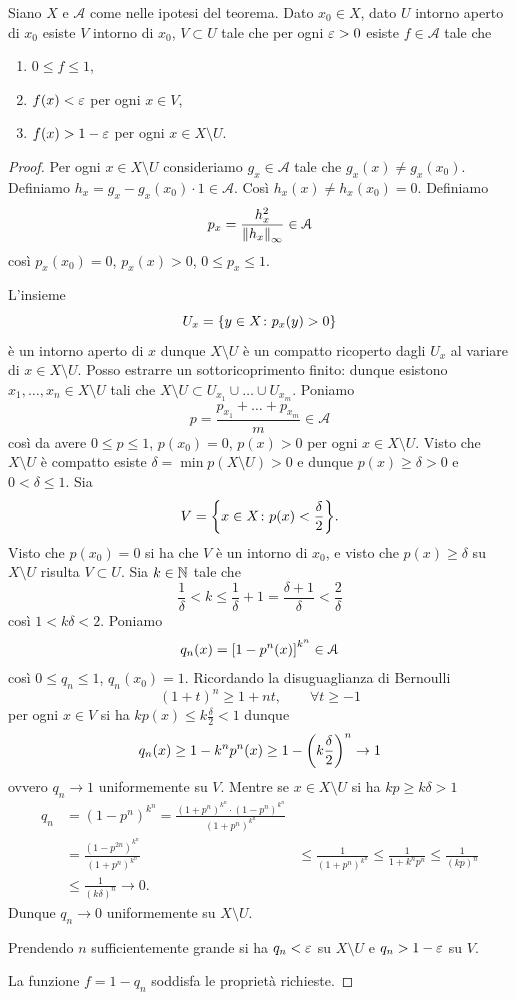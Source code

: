 \begin{lemma}
Siano $X$ e ${\mathcal A}$ come nelle ipotesi del teorema.
Dato $x_0\in X$, dato $U$ intorno aperto di $x_0$
esiste $V$ intorno di $x_0$, $V\subset U$
tale che per ogni $\varepsilon>0$ 
esiste $f\in {\mathcal A}$ tale che 
\begin{enumerate}
\item    $0 \le f \le 1$,
\item    $f(x) < \varepsilon$ per ogni $x\in V$,
\item    $f(x) > 1-\varepsilon$ per ogni $x \in X\setminus U$.
\end{enumerate}
\end{lemma}
%
\begin{proof}
Per ogni $x\in X\setminus U$ 
consideriamo $g_x \in {\mathcal A}$ 
tale che $g_x(x)\neq g_x(x_0)$.
Definiamo $h_x = g_x - g_x(x_0)\cdot 1 \in {\mathcal A}$.
Così $h_x(x) \neq  h_x(x_0) = 0$.
Definiamo
\[
 p_x = \frac{h_x^2}{{\left\Vert h_x\right\Vert}_\infty} \in {\mathcal A}
\]
così $p_x(x_0)=0$, $p_x(x)>0$,
$0\le p_x \le 1$.

L'insieme 
\[
U_x = {\left\{ y\in X\colon p_x(y)>0 \right\}}
\]
è un intorno aperto di $x$
dunque $X\setminus U$ è un compatto 
ricoperto dagli $U_x$ al variare di $x\in X\setminus U$.
Posso estrarre un sottoricoprimento finito:
dunque esistono $x_1,\dots,x_n\in X\setminus U$ 
tali che $X\setminus U \subset U_{x_1} \cup \dots \cup U_{x_m}$.
Poniamo
\[
  p = \frac{p_{x_1}+ \dots + p_{x_m}}{m} \in {\mathcal A}
\]
così da avere $0\le p \le 1$, $p(x_0)=0$,
$p(x)>0$ per ogni $x\in X\setminus U$.
Visto che $X\setminus U$ è compatto 
esiste $\delta = \min p(X\setminus U)>0$ 
e dunque $p(x)\ge \delta > 0$ e $0<\delta\le 1$.
Sia 
\[
  V = {\left\{ x\in X \colon p(x) < \frac \delta 2 \right\}}.
\]
Visto che $p(x_0)=0$ si ha che $V$ è un intorno di $x_0$,
e visto che 
$p(x) \ge \delta$ su $X\setminus U$
risulta $V\subset U$.
Sia $k\in {\mathbb N}$ tale che 
\[
 \frac 1 \delta < k \le \frac 1 \delta + 1 
 = \frac{\delta+1}{\delta}
 < \frac 2 \delta
\]
così $1 < k \delta < 2$.
Poniamo
\[
 q_n(x) = {\left[ 1-p^n(x) \right]}^{k^n} \in {\mathcal A}
\]
così $0\le q_n \le 1$, $q_n(x_0) = 1$.
Ricordando la disuguaglianza di Bernoulli
\[
  (1+t)^n \ge 1 + nt, \qquad \forall t\ge -1
\]
per ogni $x\in V$ si ha $k p(x)\le k \frac \delta 2 < 1$ 
dunque
\[
q_n(x) \ge 1- k^n p^n(x)
\ge 1 - {\left( k \frac \delta 2 \right)}^n \to 1
\]
ovvero $q_n \to 1$ uniformemente su $V$.
Mentre se $x\in X\setminus U$ 
si ha $kp \ge k\delta > 1$
\begin{align*}
 q_n 
 &= (1-p^n)^{k^n} 
  = \frac{(1+p^n)^{k^n} \cdot (1-p^n)^{k^n}}{(1+p^n)^{k^n}}\\
  &= \frac{(1-p^{2n})^{k^n}}{(1+p^n)^{k^n}}
  &\le \frac{1}{(1+p^n)^{k^n}}
  \le \frac{1}{1+ k^n p^n}
  \le \frac{1}{(kp)^n} \\
  &\le \frac {1}{(k\delta)^n} \to 0.
\end{align*}
Dunque $q_n\to 0$ uniformemente su $X\setminus U$.

Prendendo $n$ sufficientemente grande 
si ha $q_n<\varepsilon$ su $X\setminus U$ 
e $q_n > 1-\varepsilon$ su $V$.

La funzione $f=1-q_n$ soddisfa le proprietà richieste.
\end{proof}

